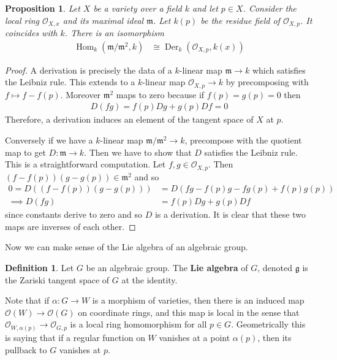 \documentclass[manuscript, printscheme]{aomart}
\theoremstyle{plain} %
\newtheorem{proposition}[equation]{Proposition}
\theoremstyle{definition}
\newtheorem{definition}[equation]{Definition}
\theoremstyle{remark}
\newcommand{\cO}{{\mathcal{O}}}
\DeclareMathOperator{\Hom}{Hom}
\newcommand{\mf}[1]{\mathfrak{#1}}
\DeclareMathOperator{\Der}{Der}
\begin{document}
\hfill

\begin{proposition}
	Let $X$ be a variety over a field $k$ and let $p\in X$. Consider
    the local ring $\cO_{X,x}$ and its maximal ideal $\mf m$. Let $k(p)$
    be the residue field of $\cO_{X,p}$. It coincides with $k$.
	There is an isomorphism \begin{align*}
		\Hom_k(\mf m/\mf m^2,k) & \cong \Der_k(\cO_{X,p},k(x))
	\end{align*}
\end{proposition}

\begin{proof}
	A derivation is precisely the data of a $k$-linear map $\mf m \to k$ which satisfies the Leibniz rule.
	This extends to a $k$-linear map $\cO_{X,p}\to k$ by precomposing with $f\mapsto f - f(p)$.
	Moreover $\mf m^2$ maps to zero because if $f(p) = g(p) = 0$ then \begin{align*}
		D(fg) = f(p)Dg + g(p)Df = 0
	\end{align*} Therefore, a derivation induces an element of the tangent space of $X$ at $p$.

	\hfill

	Conversely if we have a $k$-linear map $\mf m/\mf m^2\to k$, precompose with the quotient map to get
	$D:\mf m\to k$. Then we have to show that $D$ satisfies the Leibniz rule. This is a straightforward computation.
	Let $f,g\in \cO_{X,p}$. Then $(f-f(p))(g-g(p)) \in \mf m^2$ and so \begin{align*}
		0 = D((f-f(p))(g-g(p))) & = D(fg - f(p)g - fg(p) + f(p)g(p)) \\
		\implies D(fg)          & = f(p)Dg + g(p)Df
	\end{align*} since constants derive to zero and so $D$ is a derivation.
    It is clear that these two maps are inverses of each other.
\end{proof}

Now we can make sense of the Lie algebra of an algebraic group.
\begin{definition}
	Let $G$ be an algebraic group. The \textbf{Lie algebra} of $G$, denoted $\mf g$
	is the Zariski tangent space of $G$ at the identity.
\end{definition}

Note that if $\alpha: G\to W$ is a morphism of varieties, then there is an induced
map $\cO(W) \to \cO(G)$ on coordinate rings, and this map is local in the sense that
$\cO_{W,\alpha(p)}\to \cO_{G,p}$ is a local ring homomorphism for all $p\in G$. Geometrically
this is saying that if a regular function on $W$ vanishes at a point $\alpha(p)$,
then its pullback to $G$ vanishes at $p$.
\end{document}
